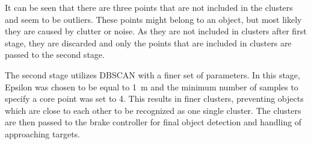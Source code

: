 \FloatBarrier\noindent
It can be seen that there are three points that are not included in the clusters and seem to be outliers.
These points might belong to an object, but most likely they are caused by clutter or noise.
As they are not included in clusters after first stage, they are discarded and only the points that are included in clusters are passed to the second stage.
\par
The second stage utilizes DBSCAN with a finer set of parameters.
In this stage, Epsilon was chosen to be equal to \SI{1}{\meter} and the minimum number of samples to specify a core point was set to 4.
This results in finer clusters, preventing objects which are close to each other to be recognized as one single cluster.
The clusters are then passed to the brake controller for final object detection and handling of approaching targets.